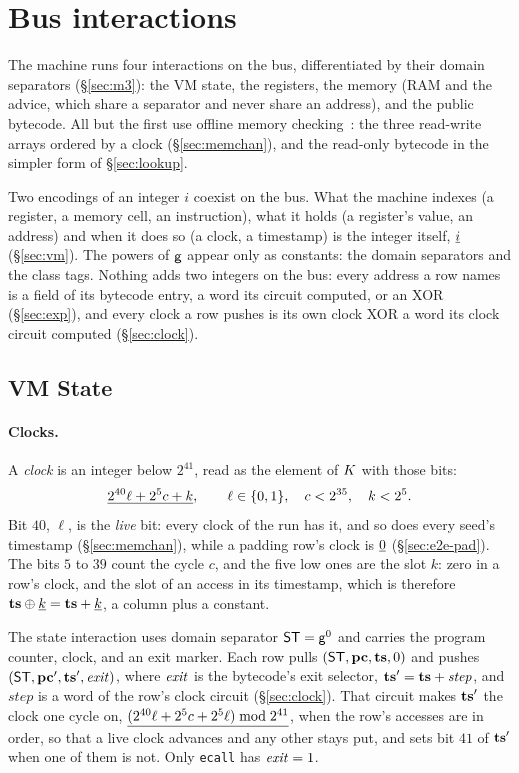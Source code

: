 \section{Bus interactions}\label{sec:omc}

The machine runs four interactions on the bus, differentiated by their domain separators (\S\ref{sec:m3}): the VM state, the registers, the memory (RAM and the advice, which share a separator and never share an address), and the public bytecode. All but the first use offline memory checking~\cite{BEGKN94}: the three read-write arrays ordered by a clock (\S\ref{sec:memchan}), and the read-only bytecode in the simpler form of \S\ref{sec:lookup}.

Two encodings of an integer $i$ coexist on the bus. What the machine indexes (a register, a memory cell, an instruction), what it holds (a register's value, an address) and when it does so (a clock, a timestamp) is the integer itself, $\underline{i}$ (\S\ref{sec:vm}). The powers of $\mathsf{g}$ appear only as constants: the domain separators and the class tags. Nothing adds two integers on the bus: every address a row names is a field of its bytecode entry, a word its circuit computed, or an XOR (\S\ref{sec:exp}), and every clock a row pushes is its own clock XOR a word its clock circuit computed (\S\ref{sec:clock}).

\subsection{VM State}\label{sec:state}

\paragraph{Clocks.} A \emph{clock} is an integer below $2^{41}$, read as the element of $K$ with those bits:
\[
  \underline{2^{40}\ell+2^{5}c+k},\qquad \ell\in\{0,1\},\quad c<2^{35},\quad k<2^{5}.
\]
Bit $40$, $\ell$, is the \emph{live} bit: every clock of the run has it, and so does every seed's timestamp (\S\ref{sec:memchan}), while a padding row's clock is $\underline{0}$ (\S\ref{sec:e2e-pad}). The bits $5$ to $39$ count the cycle $c$, and the five low ones are the slot $k$: zero in a row's clock, and the slot of an access in its timestamp, which is therefore $\mathbf{ts}\oplus\underline{k}=\mathbf{ts}+\underline{k}$, a column plus a constant.

The state interaction uses domain separator $\mathsf{ST} = \mathsf{g}^{0}$ and carries the program counter, clock, and an exit marker. Each row pulls $( \mathsf{ST},\mathbf{pc},\mathbf{ts},0 )$ and pushes $( \mathsf{ST},\mathbf{pc}',\mathbf{ts}',\mathit{exit} )$, where $\mathit{exit}$ is the bytecode's exit selector, $\mathbf{ts}'=\mathbf{ts}+\mathit{step}$, and $\mathit{step}$ is a word of the row's clock circuit (\S\ref{sec:clock}). That circuit makes $\mathbf{ts}'$ the clock one cycle on, $\underline{(2^{40}\ell+2^{5}c+2^{5}\ell)\bmod2^{41}}$, when the row's accesses are in order, so that a live clock advances and any other stays put, and sets bit $41$ of $\mathbf{ts}'$ when one of them is not. Only \texttt{ecall} has $\mathit{exit}=1$.

